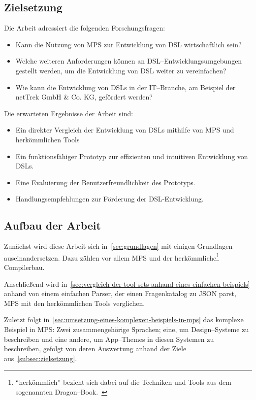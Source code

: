 \subsection{Zielsetzung}\label{subsec:zielsetzung}
Die Arbeit adressiert die folgenden Forschungsfragen:
\begin{itemize}
    \item Kann die Nutzung von \ac{MPS} zur Entwicklung von \ac{DSL} wirtschaftlich sein?
    \item Welche weiteren Anforderungen können an \ac{DSL}--Entwicklungsumgebungen gestellt werden, um die Entwicklung von \ac{DSL} weiter zu vereinfachen?
    \item Wie kann die Entwicklung von \acp{DSL} in der \acs{IT}--Branche, am Beispiel der netTrek GmbH \& Co. KG, gefördert werden?
\end{itemize}
Die erwarteten Ergebnisse der Arbeit sind:
\begin{itemize}
    \item Ein direkter Vergleich der Entwicklung von \acp{DSL} mithilfe von \ac{MPS} und herkömmlichen Tools
    \item Ein funktionsfähiger Prototyp zur effizienten und intuitiven Entwicklung von \acp{DSL}.
    \item Eine Evaluierung der Benutzerfreundlichkeit des Prototyps.
    \item Handlungsempfehlungen zur Förderung der DSL-Entwicklung.
\end{itemize}

\subsection{Aufbau der Arbeit}\label{subsec:aufbau-der-arbeit}
Zunächst wird diese Arbeit sich in~\autoref{sec:grundlagen} mit einigen Grundlagen auseinandersetzen.
Dazu zählen vor allem \ac{MPS} und der herkömmliche\footnote{\enquote{herkömmlich} bezieht sich dabei auf die Techniken und Tools aus dem sogenannten Dragon--Book.~\autocite{aho-2006}} Compilerbau.

Anschließend wird in~\autoref{sec:vergleich-der-tool-sets-anhand-eines-einfachen-beispiels} anhand von einem einfachen Parser, der einen Fragenkatalog zu \ac{JSON} parst, \ac{MPS} mit den herkömmlichen Tools verglichen.

Zuletzt folgt in~\autoref{sec:umsetzung-eines-komplexen-beispiels-in-mps} das komplexe Beispiel in \ac{MPS}: Zwei zusammengehörige Sprachen; eine, um Design--Systeme zu beschreiben und eine andere, um App--Themes in diesen Systemen zu beschreiben, gefolgt von deren Auswertung anhand der Ziele aus~\autoref{subsec:zielsetzung}.
